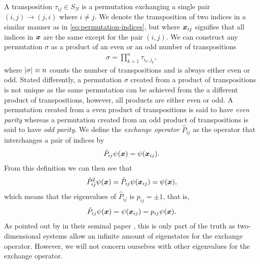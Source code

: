         A transposition $\tau_{ij} \in S_{N}$ is a permutation exchanging a single
        pair $(i, j) \to (j, i)$ where $i \neq j$.
        We denote the transposition of two indices in a similar manner as in
        \autoref{eq:permutation-indices}, but where $\boldsymbol{x}_{ij}$ signifies that
        all indices in $\boldsymbol{x}$ are the same except for the pair $(i, j)$.
        We can construct any permutation $\sigma$ as a product of an even or an
        odd number of transpositions \cite{fraleigh2003first}
        \begin{align}
            \sigma = \prod_{k = 1}^{n} \tau_{i_k, j_k},
        \end{align}
        where $\abs{\sigma} \equiv n$ counts the number of transpositions and is
        always either even or odd.
        Stated differently, a permutation $\sigma$ created from a product of
        transpositions is not unique as the same permutation can be achieved
        from the a different product of transpositions, however, all products
        are either even or odd.
        A permutation created from a even product of transpositions is said to
        have \emph{even parity} whereas a permutation created from an odd
        product of transpositions is said to have \emph{odd parity}.
        We define the \emph{exchange operator} $\hat{P}_{ij}$ as the operator
        that interchanges a pair of indices by
        \begin{align}
            \hat{P}_{ij}\psi(\boldsymbol{x})
            = \psi(\boldsymbol{x}_{ij}).
        \end{align}
        From this definition we can then see that
        \begin{align}
            \hat{P}^2_{ij}\psi(\boldsymbol{x})
            = \hat{P}_{ij}\psi(\boldsymbol{x}_{ij})
            = \psi(\boldsymbol{x}),
        \end{align}
        which means that the eigenvalues of $\hat{P}_{ij}$ is $p_{ij} = \pm
        1$, that is,
        \begin{align}
            \hat{P}_{ij}\psi(\boldsymbol{x})
            = \psi(\boldsymbol{x}_{ij})
            = p_{ij} \psi(\boldsymbol{x}).
        \end{align}
        As pointed out by \citeauthor{leinaas1977} in their seminal paper
         \cite{leinaas1977}, this is only part of the
        truth as two-dimensional systems allow an infinite amount of
        eigenstates for the exchange operator.
        However, we will not concern ourselves with other eigenvalues for the
        exchange operator.
